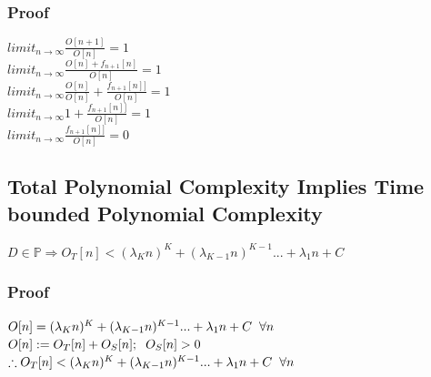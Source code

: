 \documentclass[11pt]{article}
\begin{document}
\subsubsection{Proof}
\begin{center}
$
limit_{n \rightarrow \infty } \frac{O[n+1]}{O[n]} = 1
$
\\ \vspace{2mm}
$
limit_{n \rightarrow \infty } \frac{O[n] + f_{n+1}[n]}{O[n]} = 1
$
\\ \vspace{2mm}
$
limit_{n \rightarrow \infty } \frac{O[n]}{O[n]}+  \frac{f_{n+1}[n]]}{O[n]}  = 1
$
\\ \vspace{2mm}
$
limit_{n \rightarrow \infty } 1 +  \frac{f_{n+1}[n]]}{O[n]}  = 1
$
\\ \vspace{2mm}
$
limit_{n \rightarrow \infty }  \frac{f_{n+1}[n]]}{O[n]}  = 0
$
\end{center}







\subsection{Total Polynomial Complexity Implies Time bounded Polynomial Complexity}
\begin{center}
\vspace{1mm}
$
D \in \mathbb{P} \Longrightarrow O_T[n] < (\lambda_K n)^K + (\lambda_{K-1} n)^{K-1}... + \lambda_1 n + C
$
\end{center}

\subsubsection{Proof}
\begin{center}
$
O[n] = (\lambda_K n)^K + (\lambda_{K-1} n)^{K-1}... + \lambda_1 n + C \hspace{2mm} \forall n
$
\\ \vspace{2mm}
$
O[n] := O_T[n] + O_S[n]; \hspace{2mm} O_S[n] > 0
$
\\ \vspace{2mm}
$
\therefore O_T[n] < (\lambda_K n)^K + (\lambda_{K-1} n)^{K-1}... + \lambda_1 n + C \hspace{2mm} \forall n
$
\end{center}
\end{document}
